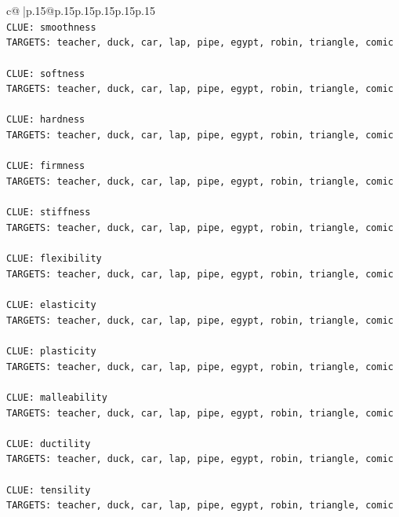 \documentclass{article}
\begin{document}
{\begin{supertabular}{c@{$\;$}|p{.15\linewidth}@{}p{.15\linewidth}p{.15\linewidth}p{.15\linewidth}p{.15\linewidth}p{.15\linewidth}}
{{{\\ 
\texttt{CLUE: smoothness} \\
\texttt{TARGETS: teacher, duck, car, lap, pipe, egypt, robin, triangle, comic} \\
\\ 
\texttt{CLUE: softness} \\
\texttt{TARGETS: teacher, duck, car, lap, pipe, egypt, robin, triangle, comic} \\
\\ 
\texttt{CLUE: hardness} \\
\texttt{TARGETS: teacher, duck, car, lap, pipe, egypt, robin, triangle, comic} \\
\\ 
\texttt{CLUE: firmness} \\
\texttt{TARGETS: teacher, duck, car, lap, pipe, egypt, robin, triangle, comic} \\
\\ 
\texttt{CLUE: stiffness} \\
\texttt{TARGETS: teacher, duck, car, lap, pipe, egypt, robin, triangle, comic} \\
\\ 
\texttt{CLUE: flexibility} \\
\texttt{TARGETS: teacher, duck, car, lap, pipe, egypt, robin, triangle, comic} \\
\\ 
\texttt{CLUE: elasticity} \\
\texttt{TARGETS: teacher, duck, car, lap, pipe, egypt, robin, triangle, comic} \\
\\ 
\texttt{CLUE: plasticity} \\
\texttt{TARGETS: teacher, duck, car, lap, pipe, egypt, robin, triangle, comic} \\
\\ 
\texttt{CLUE: malleability} \\
\texttt{TARGETS: teacher, duck, car, lap, pipe, egypt, robin, triangle, comic} \\
\\ 
\texttt{CLUE: ductility} \\
\texttt{TARGETS: teacher, duck, car, lap, pipe, egypt, robin, triangle, comic} \\
\\ 
\texttt{CLUE: tensility} \\
\texttt{TARGETS: teacher, duck, car, lap, pipe, egypt, robin, triangle, comic} \\
\\ 
}}}
\end{supertabular}}
\end{document}
